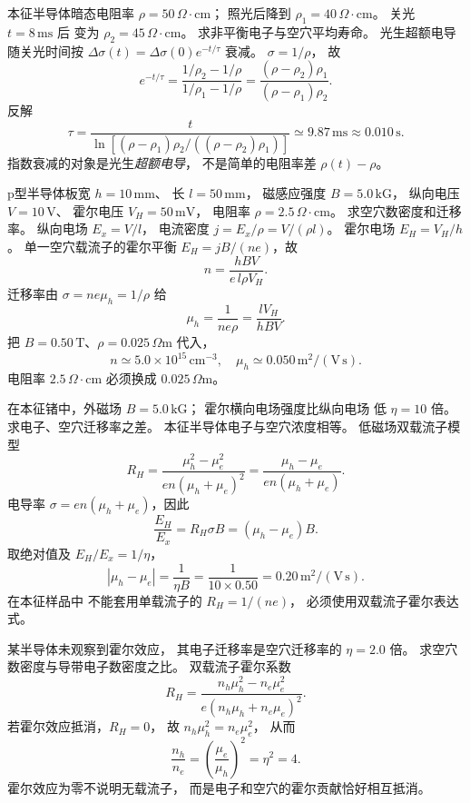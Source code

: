 本征半导体暗态电阻率
$\rho=50\,\Omega\cdot\mathrm{cm}$；
照光后降到
$\rho_1=40\,\Omega\cdot\mathrm{cm}$。
关光 $t=8\,\mathrm{ms}$ 后
变为 $\rho_2=45\,\Omega\cdot\mathrm{cm}$。
求非平衡电子与空穴平均寿命。
\exsolution
光生超额电导随关光时间按
$\Delta\sigma(t)=\Delta\sigma(0)e^{-t/\tau}$ 衰减。
$\sigma=1/\rho$，
故
\[
 e^{-t/\tau}=
 \frac{1/\rho_2-1/\rho}{1/\rho_1-1/\rho}
 =\frac{(\rho-\rho_2)\rho_1}
 {(\rho-\rho_1)\rho_2}.
\]
反解
\[
 \boxed{\tau=\frac t{
 \ln[(\rho-\rho_1)\rho_2/((\rho-\rho_2)\rho_1)]}
 \simeq9.87\,\mathrm{ms}\approx0.010\,\mathrm s}.
\]
\excheck 指数衰减的对象是光生\emph{超额电导}，
不是简单的电阻率差 $\rho(t)-\rho$。

p型半导体板宽 $h=10\,\mathrm{mm}$、
长 $l=50\,\mathrm{mm}$，
磁感应强度 $B=5.0\,\mathrm{kG}$，
纵向电压 $V=10\,\mathrm V$、
霍尔电压 $V_H=50\,\mathrm{mV}$，
电阻率 $\rho=2.5\,\Omega\cdot\mathrm{cm}$。
求空穴数密度和迁移率。
\exsolution
纵向电场 $E_x=V/l$，
电流密度 $j=E_x/\rho=V/(\rho l)$。
霍尔电场 $E_H=V_H/h$。
单一空穴载流子的霍尔平衡
$E_H=jB/(ne)$，故
\[
 \boxed{n=\frac{hBV}{e\,l\rho V_H}}.
\]
迁移率由 $\sigma=ne\mu_h=1/\rho$ 给
\[
 \boxed{\mu_h=\frac1{ne\rho}
 =\frac{lV_H}{hBV}}.
\]
把 $B=0.50\,\mathrm T$、$\rho=0.025\,\Omega\mathrm m$
代入，
\[
 \boxed{n\simeq5.0\times10^{15}\,\mathrm{cm^{-3}},
 \quad\mu_h\simeq0.050\,\mathrm{m^2/(V\,s)}}.
\]
\excheck 电阻率 $2.5\,\Omega\cdot\mathrm{cm}$
必须换成 $0.025\,\Omega\mathrm m$。

在本征锗中，外磁场
$B=5.0\,\mathrm{kG}$；
霍尔横向电场强度比纵向电场
低 $\eta=10$ 倍。求电子、空穴迁移率之差。
\exsolution
本征半导体电子与空穴浓度相等。
低磁场双载流子模型
\[
 R_H=\frac{\mu_h^2-\mu_e^2}
 {en(\mu_h+\mu_e)^2}
 =\frac{\mu_h-\mu_e}{en(\mu_h+\mu_e)}.
\]
电导率
$\sigma=en(\mu_h+\mu_e)$，因此
\[
 \frac{E_H}{E_x}=R_H\sigma B
 =(\mu_h-\mu_e)B.
\]
取绝对值及 $E_H/E_x=1/\eta$，
\[
 \boxed{|\mu_h-\mu_e|=\frac1{\eta B}
 =\frac1{10\times0.50}
 =0.20\,\mathrm{m^2/(V\,s)}}.
\]
\excheck 在本征样品中
不能套用单载流子的 $R_H=1/(ne)$，
必须使用双载流子霍尔表达式。

某半导体未观察到霍尔效应，
其电子迁移率是空穴迁移率的
$\eta=2.0$ 倍。
求空穴数密度与导带电子数密度之比。
\exsolution
双载流子霍尔系数
\[
 R_H=\frac{n_h\mu_h^2-n_e\mu_e^2}
 {e(n_h\mu_h+n_e\mu_e)^2}.
\]
若霍尔效应抵消，$R_H=0$，
故
$n_h\mu_h^2=n_e\mu_e^2$，
从而
\[
 \boxed{\frac{n_h}{n_e}=
 \left(\frac{\mu_e}{\mu_h}\right)^2
 =\eta^2=4}.
\]
\excheck 霍尔效应为零不说明无载流子，
而是电子和空穴的霍尔贡献恰好相互抵消。
